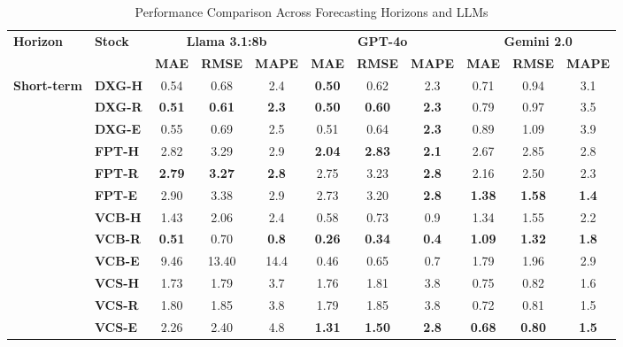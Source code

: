 \begin{table}[!h]
\centering
\caption{Performance Comparison Across Forecasting Horizons and LLMs}
\label{tab:full_performance_all}
\setlength{\tabcolsep}{3pt}
\renewcommand{\arraystretch}{1.05}
\scriptsize
\begin{tabular}{llccc|ccc|ccc}
\toprule
\multirow{2}{*}{\textbf{Horizon}} &
\multirow{2}{*}{\textbf{Stock}} &
\multicolumn{3}{c|}{\textbf{Llama 3.1:8b}} &
\multicolumn{3}{c|}{\textbf{GPT-4o}} &
\multicolumn{3}{c}{\textbf{Gemini 2.0}} \\
\cmidrule(lr){3-5} \cmidrule(lr){6-8} \cmidrule(lr){9-11}
& & \textbf{MAE} & \textbf{RMSE} & \textbf{MAPE} & \textbf{MAE} & \textbf{RMSE} & \textbf{MAPE} & \textbf{MAE} & \textbf{RMSE} & \textbf{MAPE} \\
\midrule

\multirow{12}{*}{\textbf{Short-term}}
& \textbf{DXG-H} & 0.54 & 0.68 & 2.4 & \textbf{0.50} & 0.62 & 2.3 & 0.71 & 0.94 & 3.1 \\
& \textbf{DXG-R} & \textbf{0.51} & \textbf{0.61} & \textbf{2.3} & \textbf{0.50} & \textbf{0.60} & \textbf{2.3} & 0.79 & 0.97 & 3.5 \\
& \textbf{DXG-E} & 0.55 & 0.69 & 2.5 & 0.51 & 0.64 & \textbf{2.3} & 0.89 & 1.09 & 3.9 \\
& \textbf{FPT-H} & 2.82 & 3.29 & 2.9 & \textbf{2.04} & \textbf{2.83} & \textbf{2.1} & 2.67 & 2.85 & 2.8 \\
& \textbf{FPT-R} & \textbf{2.79} & \textbf{3.27} & \textbf{2.8} & 2.75 & 3.23 & \textbf{2.8} & 2.16 & 2.50 & 2.3 \\
& \textbf{FPT-E} & 2.90 & 3.38 & 2.9 & 2.73 & 3.20 & \textbf{2.8} & \textbf{1.38} & \textbf{1.58} & \textbf{1.4} \\
& \textbf{VCB-H} & 1.43 & 2.06 & 2.4 & 0.58 & 0.73 & 0.9 & 1.34 & 1.55 & 2.2 \\
& \textbf{VCB-R} & \textbf{0.51} & 0.70 & \textbf{0.8} & \textbf{0.26} & \textbf{0.34} & \textbf{0.4} & \textbf{1.09} & \textbf{1.32} & \textbf{1.8} \\
& \textbf{VCB-E} & 9.46 & 13.40 & 14.4 & 0.46 & 0.65 & 0.7 & 1.79 & 1.96 & 2.9 \\
& \textbf{VCS-H} & 1.73 & 1.79 & 3.7 & 1.76 & 1.81 & 3.8 & 0.75 & 0.82 & 1.6 \\
& \textbf{VCS-R} & 1.80 & 1.85 & 3.8 & 1.79 & 1.85 & 3.8 & 0.72 & 0.81 & 1.5 \\
& \textbf{VCS-E} & 2.26 & 2.40 & 4.8 & \textbf{1.31} & \textbf{1.50} & \textbf{2.8} & \textbf{0.68} & \textbf{0.80} & \textbf{1.5} \\
\midrule


\end{tabular}
\end{table}
